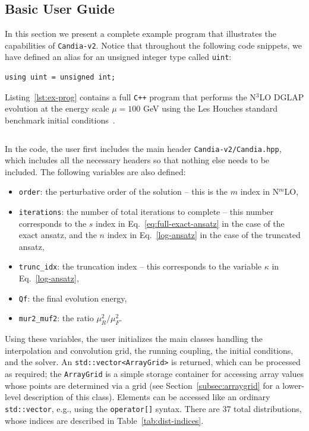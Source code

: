 \documentclass[preprint,12pt]{elsarticle}
\begin{document}
\subsection{Basic User Guide}
\label{subsec:ex-prog}

In this section we present a complete example program that illustrates the capabilities of \texttt{Candia-v2}. Notice that throughout the following code snippets, 
we have defined an alias for an unsigned integer type called \texttt{uint}:

\begin{verbatim}
using uint = unsigned int;
\end{verbatim}

Listing~\ref{lst:ex-prog} contains a full \texttt{C++} program that performs the N$^3$LO DGLAP evolution at the energy scale $\mu=100$ GeV using the Les Houches standard benchmark initial conditions~\cite{Dittmar:2005ed}.
% 
\begin{listing}
  \inputminted[frame=lines,linenos]{cpp}{res/example.cpp}
  \caption{Example program to perform an N$^3$LO PDF evolution at $\mu=100$ GeV, using the current Les Houches standard benchmark initial conditions~\cite{Dittmar:2005ed}.}
  \label{lst:ex-prog}
\end{listing}
% 
In the code, the user first includes the main header \texttt{Candia-v2/Candia.hpp},  which includes all the necessary headers so that nothing else needs to be included.
The following variables are also defined:
\begin{itemize}
\item \texttt{order}: the perturbative order of the solution -- this is the $m$ index in N$^m$LO,
\item \texttt{iterations}: the number of total iterations to complete -- this number corresponds to the $s$ index in Eq.~\eqref{eq:full-exact-ansatz} in the case of the exact ansatz, and the $n$ index in Eq.~\eqref{log-ansatz} in the case of the truncated ansatz,
\item \texttt{trunc_idx}: the truncation index -- this corresponds to the variable $\kappa$ in Eq.~\eqref{log-ansatz},
\item \texttt{Qf}: the final evolution energy,
\item \texttt{mur2_muf2}: the ratio $\mu_R^2/\mu_F^2$.
\end{itemize}
%
Using these variables, the user initializes the main classes handling the interpolation and convolution grid, the running coupling, the initial conditions, and the solver.
An \texttt{std::vector<ArrayGrid>} is returned, which can be processed as required; the \texttt{ArrayGrid} is a simple storage container for accessing array values whose points are determined via a grid (see Section~\ref{subsec:arraygrid} for a lower-level description of this class).
Elements can be accessed like an ordinary \texttt{std::vector}, e.g., using the \texttt{operator[]} syntax. There are 37 total distributions, whose indices are described in Table~\ref{tab:dist-indices}. 
\end{document}
